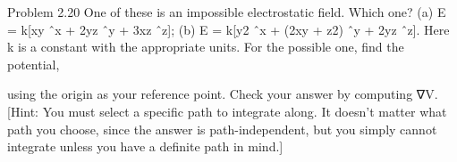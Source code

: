 \documentclass[12pt]{article}
\begin{document}

Problem 2.20 One of these is an impossible electrostatic field. Which one?
(a) E = k[xy ˆx + 2yz ˆy + 3xz ˆz];
(b) E = k[y2 ˆx + (2xy + z2) ˆy + 2yz ˆz].
Here k is a constant with the appropriate units. For the possible one, find the potential,

using the origin as your reference point. Check your answer by computing ∇V.
[Hint: You must select a specific path to integrate along. It doesn’t matter what path
you choose, since the answer is path-independent, but you simply cannot integrate
unless you have a definite path in mind.]






\end{document}
